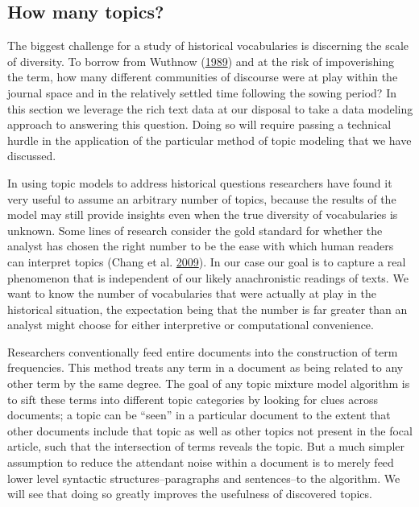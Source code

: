 \documentclass[]{book}
\theoremstyle{definition}
\theoremstyle{definition}
\theoremstyle{definition}
\theoremstyle{remark}
\begin{document}
\hypertarget{how-many-topics}{%
\subsection{How many topics?}\label{how-many-topics}}

The biggest challenge for a study of historical vocabularies is
discerning the scale of diversity. To borrow from Wuthnow
(\protect\hyperlink{ref-Wuthnow1989Communities}{1989}) and at the risk
of impoverishing the term, how many different communities of discourse
were at play within the journal space and in the relatively settled time
following the sowing period? In this section we leverage the rich text
data at our disposal to take a data modeling approach to answering this
question. Doing so will require passing a technical hurdle in the
application of the particular method of topic modeling that we have
discussed.

In using topic models to address historical questions researchers have
found it very useful to assume an arbitrary number of topics, because
the results of the model may still provide insights even when the true
diversity of vocabularies is unknown. Some lines of research consider
the gold standard for whether the analyst has chosen the right number to
be the ease with which human readers can interpret topics (Chang et al.
\protect\hyperlink{ref-Chang2009Reading}{2009}). In our case our goal is
to capture a real phenomenon that is independent of our likely
anachronistic readings of texts. We want to know the number of
vocabularies that were actually at play in the historical situation, the
expectation being that the number is far greater than an analyst might
choose for either interpretive or computational convenience.

Researchers conventionally feed entire documents into the construction
of term frequencies. This method treats any term in a document as being
related to any other term by the same degree. The goal of any topic
mixture model algorithm is to sift these terms into different topic
categories by looking for clues across documents; a topic can be
``seen'' in a particular document to the extent that other documents
include that topic as well as other topics not present in the focal
article, such that the intersection of terms reveals the topic. But a
much simpler assumption to reduce the attendant noise within a document
is to merely feed lower level syntactic structures--paragraphs and
sentences--to the algorithm. We will see that doing so greatly improves
the usefulness of discovered topics.
\end{document}
